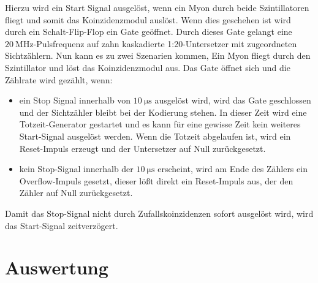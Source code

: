 \documentclass{article}
\begin{document}
Hierzu wird ein Start Signal ausgelöst, wenn ein Myon durch beide Szintillatoren fliegt und somit das Koinzidenzmodul auslöst. 
Wenn dies geschehen ist wird durch ein Schalt-Flip-Flop ein Gate geöffnet. Durch dieses Gate gelangt eine $\SI{20}{\mega\hertz}$-Pulsfrequenz auf zahn kaskadierte 1:20-Untersetzer mit
zugeordneten Sichtzählern. Nun kann es zu zwei Szenarien kommen, Ein Myon fliegt durch den Szintillator und löst das Koinzidenzmodul aus. Das Gate öffnet sich und die Zählrate wird gezählt, wenn:
\begin{itemize}
    \item ein Stop Signal innerhalb von $\SI{10}{\micro\second}$ ausgelöst wird, wird das Gate geschlossen und der Sichtzähler bleibt bei der Kodierung stehen. In dieser Zeit wird eine Totzeit-Generator gestartet
    und es kann für eine gewisse Zeit kein weiteres Start-Signal ausgelöst werden. Wenn die Totzeit abgelaufen ist, wird ein Reset-Impuls erzeugt und der Untersetzer auf Null zurückgesetzt.
    \item kein Stop-Signal innerhalb der $\SI{10}{\micro\second}$ erscheint, wird am Ende des Zählers ein Overflow-Impuls gesetzt, dieser lößt direkt ein Reset-Impuls aus, der den Zähler auf Null zurückgesetzt. 
\end{itemize}
Damit das Stop-Signal nicht durch Zufallskoinzidenzen sofort ausgelöst wird, wird das Start-Signal zeitverzögert.

\section{Auswertung}
\end{document}
